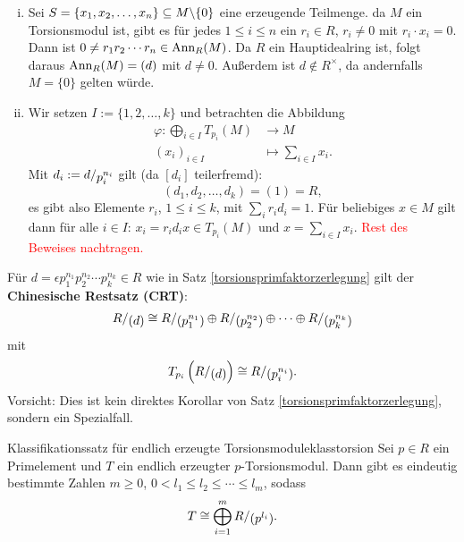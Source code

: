 \begin{beweis}
\begin{enumerate}[(i)]
\item Sei $S=\{x_1, x_2, \dots, x_n\} \subseteq M \backslash \{0\}$ eine erzeugende Teilmenge. da $M$ ein Torsionsmodul ist, gibt es für jedes $1 \leq i \leq n$ ein $r_i \in R$, $r_i \neq 0$ mit $r_i \cdot x_i = 0$. Dann ist $0 \neq r_1r_2 \cdots r_n \in \operatorname{\text{Ann}}_R(M)$. Da $R$ ein Hauptidealring ist, folgt daraus $\operatorname{\text{Ann}}_R(M)=(d)$ mit $d \neq 0$. Außerdem ist $d \notin R^\times$, da andernfalls $M=\{0\}$ gelten würde.
\item Wir setzen $I:=\{1,2,\dots, k\}$ und betrachten die Abbildung
\begin{equation}
\begin{split}
\varphi: \bigoplus_{i \in I} T_{p_i}(M) &\to M\\
(x_i)_{i \in I} &\mapsto \sum_{i \in I} x_i.
\end{split}
\end{equation}
Mit $d_i := \quotient{d}{p_i^{n_i}}$ gilt (da $[d_i]$ teilerfremd):
\begin{equation}
(d_1, d_2, \dots, d_k ) = (1) = R,
\end{equation}
es gibt also Elemente $r_i$, $1 \leq i \leq k$, mit $\sum_i r_i d_i = 1$. Für beliebiges $x \in M$ gilt dann für alle $i \in I$: $x_i = r_i d_i x \in T_{p_i}(M)$ und $x=\sum_{i \in I} x_i$. \textcolor{red}{Rest des Beweises nachtragen.}
\end{enumerate}
\end{beweis}
\begin{beispiel}
Für $d=\epsilon p_1^{n_1}p_2^{n_2} \cdots p_k^{n_k} \in R$ wie in Satz \ref{torsionsprimfaktorzerlegung} gilt der \textbf{Chinesische Restsatz (CRT)}:
\begin{equation}
\quotient{R}{(d)} \cong \quotient{R}{(p_1^{n_1})} \oplus \quotient{R}{(p_2^{n_2})} \oplus \cdots \oplus \quotient{R}{(p_k^{n_k})}
\end{equation}
mit 
\begin{equation}
T_{p_i}\left( \quotient{R}{(d)}\right) \cong \quotient{R}{(p_i^{n_i})}.
\end{equation}
Vorsicht: Dies ist kein direktes Korollar von Satz \ref{torsionsprimfaktorzerlegung}, sondern ein Spezialfall.
\end{beispiel}
\begin{theorem}{Klassifikationssatz für endlich erzeugte Torsionsmodule}{klasstorsion}
Sei $p \in R$ ein Primelement und $T$ ein endlich erzeugter $p$-Torsionsmodul. Dann gibt es eindeutig bestimmte Zahlen $m \geq 0$, $0 < l_1 \leq l_2 \leq \cdots \leq l_m$, sodass
\begin{equation}
\label{eq:isotorsion}
T \cong \bigoplus_{i=1}^m \quotient{R}{(p^{l_i})}.
\end{equation}
\end{theorem}
